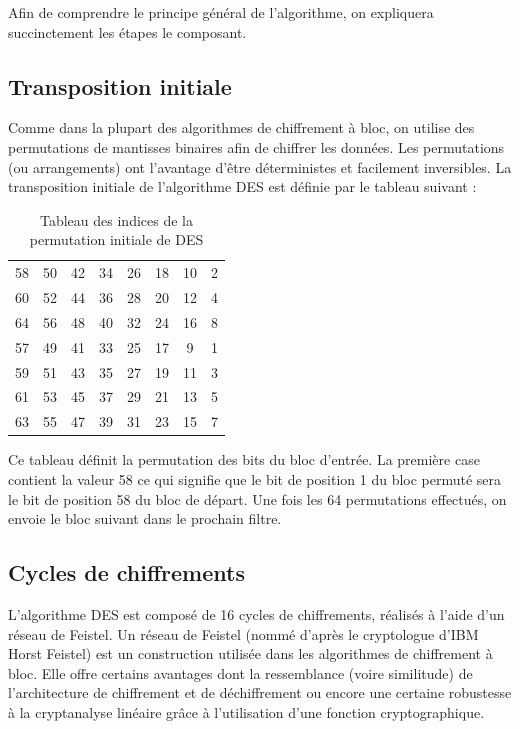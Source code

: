 \documentclass[a4paper]{article}
\begin{document}
Afin de comprendre le principe général de l'algorithme, on expliquera succinctement les étapes le composant.

\subsection{Transposition initiale}
Comme dans la plupart des algorithmes de chiffrement à bloc, on utilise des permutations de mantisses binaires afin de chiffrer les données. Les permutations (ou arrangements) ont l'avantage d'être déterministes et facilement inversibles. La transposition initiale de l'algorithme DES est définie par le tableau suivant : 


\begin{table}[h]
\centering
\begin{tabular}{|cccccccc|}
  \hline
  58 & 50 & 42 & 34 & 26 & 18 & 10 & 2 \\
  60 & 52 & 44 & 36 & 28 & 20 & 12 & 4 \\
  64 & 56 & 48 & 40 & 32 & 24 & 16 & 8 \\
  57 & 49 & 41 & 33 & 25 & 17 & 9 & 1 \\
  59 & 51 & 43 & 35 & 27 & 19 & 11 & 3 \\
  61 & 53 & 45 & 37 & 29 & 21 & 13 & 5 \\
  63 & 55 & 47 & 39 & 31 & 23 & 15 & 7 \\
  \hline
\end{tabular}
\caption{Tableau des indices de la permutation initiale de DES}
\end{table}
\smallbreak
Ce tableau définit la permutation des bits du bloc d'entrée. La première case contient la valeur 58 ce qui signifie que le bit de position 1 du bloc permuté sera le bit de position 58 du bloc de départ. Une fois les 64 permutations effectués, on envoie le bloc suivant dans le prochain filtre.

\subsection{Cycles de chiffrements}
L'algorithme DES est composé de 16 cycles de chiffrements, réalisés à l'aide d'un réseau de Feistel. Un réseau de Feistel (nommé d'après le cryptologue d'IBM Horst Feistel) est un construction utilisée dans les algorithmes de chiffrement à bloc. Elle offre certains avantages dont la ressemblance (voire similitude) de l'architecture de chiffrement et de déchiffrement ou encore une certaine robustesse à la cryptanalyse linéaire grâce à l'utilisation d'une fonction cryptographique.
\end{document}
